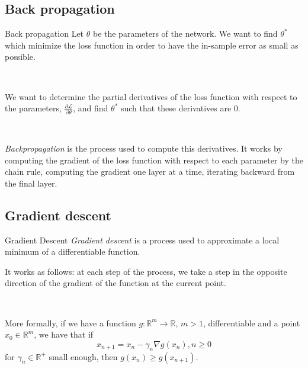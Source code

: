 \documentclass[11pt]{beamer}
\begin{document}
\subsection{Back propagation}
\begin{frame}{Back propagation}
Let $\theta$ be the parameters of the network. We want to find $\theta^*$ which minimize the loss function in order to have the in-sample error as small as possible. 

~

We want to determine the partial derivatives of the loss function with respect to the parameters, $\frac{\partial \mathcal{L}}{\partial \theta}$, and find $\theta^*$ such that these derivatives are $0$.

~

\textit{Backpropagation} \cite{11} is the process used to compute this derivatives. It works by computing the gradient of the loss function with respect to each parameter by the chain rule, computing the gradient one layer at a time, iterating backward from the final layer.
\end{frame}

\subsection{Gradient descent}
\begin{frame}{Gradient Descent}
\textit{Gradient descent} \cite{1} is a process used to approximate a local minimum of a differentiable function. 

It works as follows: at each step of the process, we take a step in the opposite direction of the gradient of the function at the current point.

~

More formally, if we have a function $g: \mathbb{R}^m \rightarrow \mathbb{R}$, $m>1$, differentiable and a point $x_0\in \mathbb{R}^m$, we have that if
$$
x_{n+1} = x_n -\gamma_n \nabla g(x_n), n\geq 0
$$
for $\gamma_n \in \mathbb{R}^+$ small enough, then $g(x_n) \geq g(x_{n+1})$. 

\end{frame}
\end{document}
